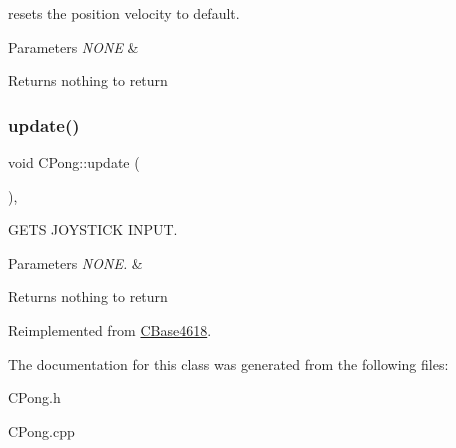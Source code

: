 resets the position velocity to default. 


\begin{DoxyParams}{Parameters}
{\em N\+O\+NE} & \\
\hline
\end{DoxyParams}
\begin{DoxyReturn}{Returns}
nothing to return 
\end{DoxyReturn}
\hypertarget{class_c_pong_a819c9942552ff12a11be284a89e3ab12}{}\label{class_c_pong_a819c9942552ff12a11be284a89e3ab12} 
\subsubsection{\texorpdfstring{update()}{update()}}
{\footnotesize\ttfamily void C\+Pong\+::update (\begin{DoxyParamCaption}{ }\end{DoxyParamCaption})\hspace{0.3cm}{\ttfamily [override]}, {\ttfamily [virtual]}}



G\+E\+TS J\+O\+Y\+S\+T\+I\+CK I\+N\+P\+UT. 


\begin{DoxyParams}{Parameters}
{\em N\+O\+N\+E.} & \\
\hline
\end{DoxyParams}
\begin{DoxyReturn}{Returns}
nothing to return 
\end{DoxyReturn}


Reimplemented from \hyperlink{class_c_base4618_ae1ac81eaa56ded6600262c361f723cb8}{C\+Base4618}.



The documentation for this class was generated from the following files\+:\begin{DoxyCompactItemize}
\item 
C\+Pong.\+h\item 
C\+Pong.\+cpp\end{DoxyCompactItemize}
